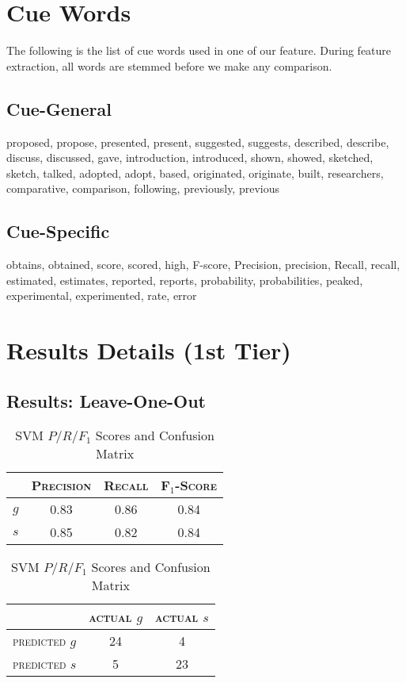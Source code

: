 \chapter{Cue Words}
\label{cuewords}
The following is the list of cue words used in one of our feature. During feature extraction, all words are stemmed before we make any comparison.
\section{Cue-General}
proposed, propose, presented, present, suggested, suggests, described, describe, discuss, discussed, gave, introduction, introduced, shown, showed, sketched, sketch, talked, adopted, adopt, based, originated, originate, built, researchers, comparative, comparison, following, previously, previous

\section{Cue-Specific}
obtains, obtained, score, scored, high, F-score, Precision, precision, Recall, recall, estimated, estimates, reported, reports, probability, probabilities, peaked, experimental, experimented, rate, error

\chapter{Results Details (1st Tier)}
\label{resultsdetails}
\section{Results: Leave-One-Out}
\begin{table}[ht]
\begin{minipage}[b]{0.45\linewidth}\centering
\begin{tabular}{ c | c  c  c }
	& \textsc{Precision} & \textsc{Recall} & \textsc{F$_1$-Score} \\
	\hline
	\textsc{$g$} 	& 0.83 & 0.86 & 0.84 \\
	\textsc{$s$}	& 0.85 & 0.82 & 0.84
\end{tabular}
\end{minipage}
\hspace{0.5cm}
\begin{minipage}[b]{0.45\linewidth}
\centering
\begin{tabular}{ c | c  c }
	 & \textsc{actual $g$} & \textsc{actual $s$} \\
	\hline
	\textsc{predicted $g$} 	& 24 & 4 \\
	\textsc{predicted $s$}		& 5 & 23
\end{tabular}
\end{minipage}
\caption{SVM $P/R/F_1$ Scores and Confusion Matrix}
\end{table}

